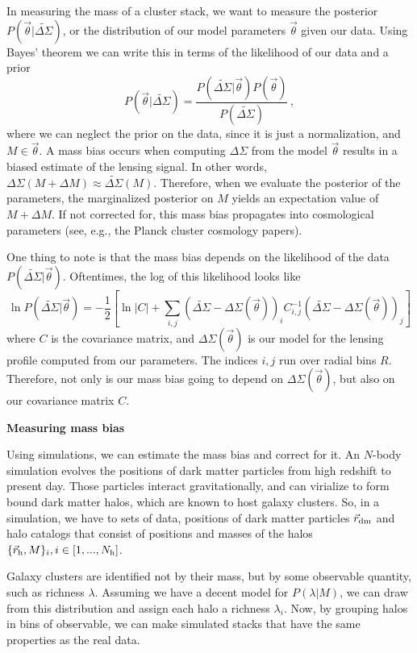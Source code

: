 \documentclass[12pt]{article}
\newcommand{\wds}{\widetilde{\Delta\Sigma}}
\newcommand{\ds}{\Delta\Sigma}
\newcommand{\model}{\vec{\theta}}
\begin{document}
In measuring the mass of a cluster stack, we want to measure the posterior $P(\vec{\theta}|\wds)$, or the distribution of our model parameters $\vec{\theta}$ given our data. Using Bayes' theorem we can write this in terms of the likelihood of our data and a prior
%
\begin{equation}
	\label{eq:posterior}
	P(\vec{\theta}|\wds) = \frac{P(\wds|\vec{\theta})P(\vec{\theta})}{P(\wds)}\,,
\end{equation}
%
where we can neglect the prior on the data, since it is just a normalization, and $M\in\model$. A mass bias occurs when computing $\ds$ from the model $\model$ results in a biased estimate of the lensing signal. In other words, $\Delta\Sigma(M+\Delta M) \approx \wds(M)$. Therefore, when we evaluate the posterior of the parameters, the marginalized posterior on $M$ yields an expectation value of $M+\Delta M$. If not corrected for, this mass bias propagates into cosmological parameters (see, e.g., the Planck cluster cosmology papers).

One thing to note is that the mass bias depends on the likelihood of the data $P(\wds|\vec{\theta})$. Oftentimes, the log of this likelihood looks like
%
\begin{equation}
	\label{eq:likelihood}
	\ln P(\wds|\vec{\theta}) = -\frac{1}{2}\left[ \ln|C| +\sum_{i,j} (\wds - \Delta\Sigma(\model))_i C_{i,j}^{-1}(\wds - \Delta\Sigma(\model))_j  \right]
\end{equation}
%
where $C$ is the covariance matrix, and $\ds(\model)$ is our model for the lensing profile computed from our parameters. The indices $i,j$ run over radial bins $R$. Therefore, not only is our mass bias going to depend on $\ds(\model)$, but also on our covariance matrix $C$.

\vspace{12pt}
\noindent
{\bf Measuring mass bias}

Using simulations, we can estimate the mass bias and correct for it. An $N$-body simulation evolves the positions of dark matter particles from high redshift to present day. Those particles interact gravitationally, and can virialize to form bound dark matter halos, which are known to host galaxy clusters. So, in a simulation, we have to sets of data, positions of dark matter particles $\vec{r}_{\rm dm}$ and halo catalogs that consist of positions and masses of the halos $\{\vec{r}_{\rm h}, M\}_i, i\in[1,...,N_{\rm h}]$.

Galaxy clusters are identified not by their mass, but by some observable quantity, such as richness $\lambda$. Assuming we have a decent model for $P(\lambda|M)$, we can draw from this distribution and assign each halo a richness $\lambda_i$. Now, by grouping halos in bins of observable, we can make simulated stacks that have the same properties as the real data.
\end{document}
